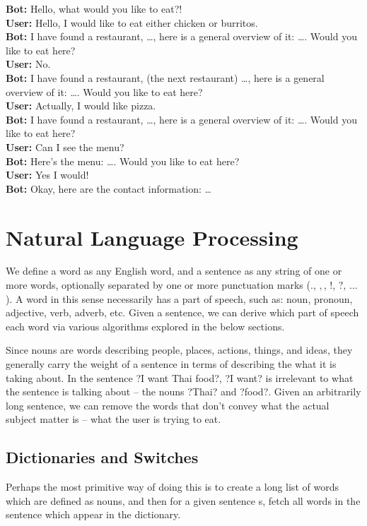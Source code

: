 \documentclass{article}
\begin{document}
    \textbf{Bot:} Hello, what would you like to eat?!\\
    \textbf{User:} Hello, I would like to eat either chicken or burritos.\\
    \textbf{Bot:} I have found a restaurant, \ldots, here is a general overview of it: \ldots. Would you like to eat here?\\
    \textbf{User:} No.\\
    \textbf{Bot:} I have found a restaurant, (the next restaurant) \ldots, here is a general overview of it: \ldots. Would you like to eat here?\\
    \textbf{User:} Actually, I would like pizza.\\
    \textbf{Bot:} I have found a restaurant, \ldots, here is a general overview of it: \ldots. Would you like to eat here?\\
    \textbf{User:} Can I see the menu?\\
    \textbf{Bot:} Here's the menu: \ldots. Would you like to eat here?\\
    \textbf{User:} Yes I would!\\
    \textbf{Bot:} Okay, here are the contact information: \ldots\\
    

\section{Natural Language Processing}
        We define a word as any English word, and a sentence as any string of one or more words, optionally separated by one or more punctuation marks ($.$, 
$,$, $!$, $?$, $\ldots$). A word in this sense necessarily has a part of speech, such as: noun, pronoun, adjective, verb, adverb, etc. Given a sentence, we can 
derive which part of speech each word via various algorithms explored in the below sections.

        Since nouns are words describing people, places, actions, things, and ideas, they generally carry the weight of a sentence in terms of describing the 
what it is taking about. In the sentence ?I want Thai food?, ?I want? is irrelevant to what the sentence is talking about -- the nouns ?Thai? and ?food?. Given 
an arbitrarily long sentence, we can remove the words that don't convey what the actual subject matter is -- what the user is trying to eat.

    \subsection{Dictionaries and Switches}
        Perhaps the most primitive way of doing this is to create a long list of words which are defined as nouns, and then for a given sentence s, fetch all 
words in the sentence which appear in the dictionary.
\end{document}
